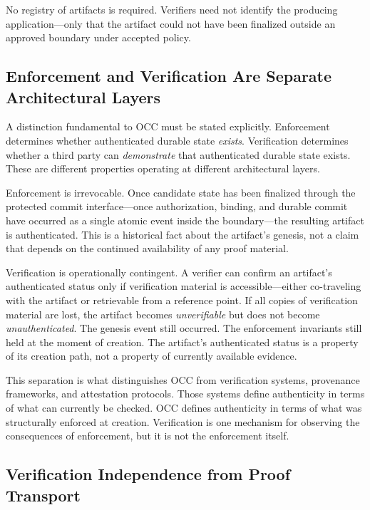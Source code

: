 \documentclass[11pt,letterpaper]{article}
\theoremstyle{occplain}
\theoremstyle{occremark}
\begin{document}
No registry of artifacts is required. Verifiers need not identify the producing application---only that the artifact could not have been finalized outside an approved boundary under accepted policy.


\subsection{Enforcement and Verification Are Separate Architectural Layers}
\label{sec:enforcement-verification}

A distinction fundamental to OCC must be stated explicitly. Enforcement determines whether authenticated durable state \emph{exists}. Verification determines whether a third party can \emph{demonstrate} that authenticated durable state exists. These are different properties operating at different architectural layers.

Enforcement is irrevocable. Once candidate state has been finalized through the protected commit interface---once authorization, binding, and durable commit have occurred as a single atomic event inside the boundary---the resulting artifact is authenticated. This is a historical fact about the artifact's genesis, not a claim that depends on the continued availability of any proof material.

Verification is operationally contingent. A verifier can confirm an artifact's authenticated status only if verification material is accessible---either co-traveling with the artifact or retrievable from a reference point. If all copies of verification material are lost, the artifact becomes \emph{unverifiable} but does not become \emph{unauthenticated}. The genesis event still occurred. The enforcement invariants still held at the moment of creation. The artifact's authenticated status is a property of its creation path, not a property of currently available evidence.

This separation is what distinguishes OCC from verification systems, provenance frameworks, and attestation protocols. Those systems define authenticity in terms of what can currently be checked. OCC defines authenticity in terms of what was structurally enforced at creation. Verification is one mechanism for observing the consequences of enforcement, but it is not the enforcement itself.


\subsection{Verification Independence from Proof Transport}
\label{sec:verification-independence}
\end{document}
